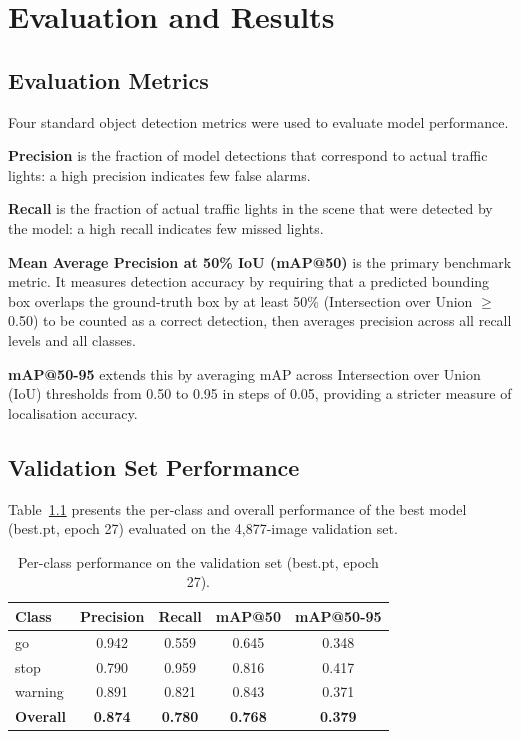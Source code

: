 \chapter{Evaluation and Results}

\section{Evaluation Metrics}

Four standard object detection metrics were used to evaluate model performance.

\textbf{Precision} is the fraction of model detections that correspond to actual traffic lights: a high precision indicates few false alarms.

\textbf{Recall} is the fraction of actual traffic lights in the scene that were detected by the model: a high recall indicates few missed lights.

\textbf{Mean Average Precision at 50\% IoU (mAP@50)} is the primary benchmark metric. It measures detection accuracy by requiring that a predicted bounding box overlaps the ground-truth box by at least 50\% (Intersection over Union $\geq$ 0.50) to be counted as a correct detection, then averages precision across all recall levels and all classes.

\textbf{mAP@50-95} extends this by averaging mAP across Intersection over Union (IoU) thresholds from 0.50 to 0.95 in steps of 0.05, providing a stricter measure of localisation accuracy.

\section{Validation Set Performance}

Table~\ref{tb:val_results} presents the per-class and overall performance of the best model (best.pt, epoch 27) evaluated on the 4,877-image validation set.

\begin{table}[htbp]
\caption{Per-class performance on the validation set (best.pt, epoch 27).}
\label{tb:val_results}
\centering
\small
\begin{tabular}{l c c c c}
\toprule
\textbf{Class} & \textbf{Precision} & \textbf{Recall} & \textbf{mAP@50} & \textbf{mAP@50-95} \\
\midrule
go & 0.942 & 0.559 & 0.645 & 0.348 \\
stop & 0.790 & 0.959 & 0.816 & 0.417 \\
warning & 0.891 & 0.821 & 0.843 & 0.371 \\
\midrule
\textbf{Overall} & \textbf{0.874} & \textbf{0.780} & \textbf{0.768} & \textbf{0.379} \\
\bottomrule
\end{tabular}
\end{table}

